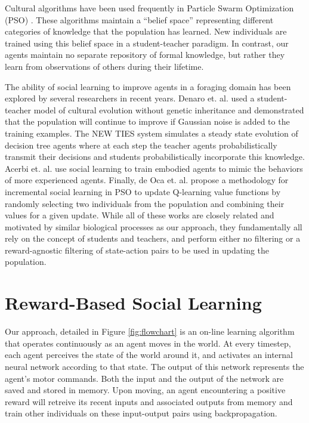 \documentclass{acm_proc_article-sp}
\begin{document}
Cultural algorithms \cite{reynolds1994introduction} have been used frequently in Particle Swarm Optimization (PSO) \cite{kennedy1995particle}. These algorithms maintain a ``belief space'' representing different categories of knowledge that the population has learned. New individuals are trained using this belief space in a student-teacher paradigm. In contrast, our agents maintain no separate repository of formal knowledge, but rather they learn from observations of others during their lifetime.

The ability of social learning to improve agents in a foraging domain has been explored by several researchers in recent years. Denaro et. al. \cite{denaro1996cultural} used a student-teacher model of cultural evolution without genetic inheritance and demonstrated that the population will continue to improve if Gaussian noise is added to the training examples. The NEW TIES system \cite{haasdijk2008social, vogt2010modeling} simulates a steady state evolution of decision tree agents where at each step the teacher agents probabilistically transmit their decisions and students probabilistically incorporate this knowledge. Acerbi et. al. \cite{acerbi2007social} use social learning to train embodied agents to mimic the behaviors of more experienced agents. Finally, de Oca et. al. \cite{de2011incremental} propose a methodology for incremental social learning in PSO to update Q-learning \cite{watkins1992q} value functions by randomly selecting two individuals from the population and combining their values for a given update. While all of these works are closely related and motivated by similar biological processes as our approach, they fundamentally all rely on the concept of students and teachers, and perform either no filtering or a reward-agnostic filtering of state-action pairs to be used in updating the population.


\section{Reward-Based Social Learning}
\label{sec:rbsl}

Our approach, detailed in Figure \ref{fig:flowchart} is an on-line learning algorithm that operates continuously as an agent moves in the world. At every timestep, each agent perceives the state of the world around it, and activates an internal neural network according to that state. The output of this network represents the agent's motor commands. Both the input and the output of the network are saved and stored in memory. Upon moving, an agent encountering a positive reward will retreive its recent inputs and associated outputs from memory and train other individuals on these input-output pairs using backpropagation.
\end{document}
